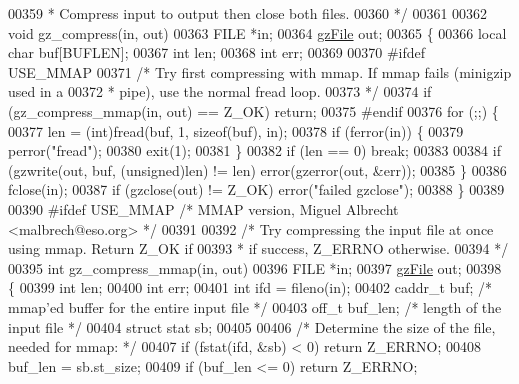 \begin{DoxyCode}
{{{{00359 \textcolor{comment}{ * Compress input to output then close both files.}
00360 \textcolor{comment}{ */}
00361 
00362 \textcolor{keywordtype}{void} gz\_compress(in, out)
00363     FILE   *in;
00364     \hyperlink{structgz_file__s}{gzFile} out;
00365 \{
00366     local \textcolor{keywordtype}{char} buf[BUFLEN];
00367     \textcolor{keywordtype}{int} len;
00368     \textcolor{keywordtype}{int} err;
00369 
00370 \textcolor{preprocessor}{#ifdef USE\_MMAP}
00371     \textcolor{comment}{/* Try first compressing with mmap. If mmap fails (minigzip used in a}
00372 \textcolor{comment}{     * pipe), use the normal fread loop.}
00373 \textcolor{comment}{     */}
00374     \textcolor{keywordflow}{if} (gz\_compress\_mmap(in, out) == Z\_OK) \textcolor{keywordflow}{return};
00375 \textcolor{preprocessor}{#endif}
00376     \textcolor{keywordflow}{for} (;;) \{
00377         len = (int)fread(buf, 1, \textcolor{keyword}{sizeof}(buf), in);
00378         \textcolor{keywordflow}{if} (ferror(in)) \{
00379             perror(\textcolor{stringliteral}{"fread"});
00380             exit(1);
00381         \}
00382         \textcolor{keywordflow}{if} (len == 0) \textcolor{keywordflow}{break};
00383 
00384         \textcolor{keywordflow}{if} (gzwrite(out, buf, (\textcolor{keywordtype}{unsigned})len) != len) error(gzerror(out, &err));
00385     \}
00386     fclose(in);
00387     \textcolor{keywordflow}{if} (gzclose(out) != Z\_OK) error(\textcolor{stringliteral}{"failed gzclose"});
00388 \}
00389 
00390 \textcolor{preprocessor}{#ifdef USE\_MMAP }\textcolor{comment}{/* MMAP version, Miguel Albrecht <malbrech@eso.org> */}\textcolor{preprocessor}{}
00391 
00392 \textcolor{comment}{/* Try compressing the input file at once using mmap. Return Z\_OK if}
00393 \textcolor{comment}{ * if success, Z\_ERRNO otherwise.}
00394 \textcolor{comment}{ */}
00395 \textcolor{keywordtype}{int} gz\_compress\_mmap(in, out)
00396     FILE   *in;
00397     \hyperlink{structgz_file__s}{gzFile} out;
00398 \{
00399     \textcolor{keywordtype}{int} len;
00400     \textcolor{keywordtype}{int} err;
00401     \textcolor{keywordtype}{int} ifd = fileno(in);
00402     caddr\_t buf;    \textcolor{comment}{/* mmap'ed buffer for the entire input file */}
00403     off\_t buf\_len;  \textcolor{comment}{/* length of the input file */}
00404     \textcolor{keyword}{struct }stat sb;
00405 
00406     \textcolor{comment}{/* Determine the size of the file, needed for mmap: */}
00407     \textcolor{keywordflow}{if} (fstat(ifd, &sb) < 0) \textcolor{keywordflow}{return} Z\_ERRNO;
00408     buf\_len = sb.st\_size;
00409     \textcolor{keywordflow}{if} (buf\_len <= 0) \textcolor{keywordflow}{return} Z\_ERRNO;
}}}}
\end{DoxyCode}
